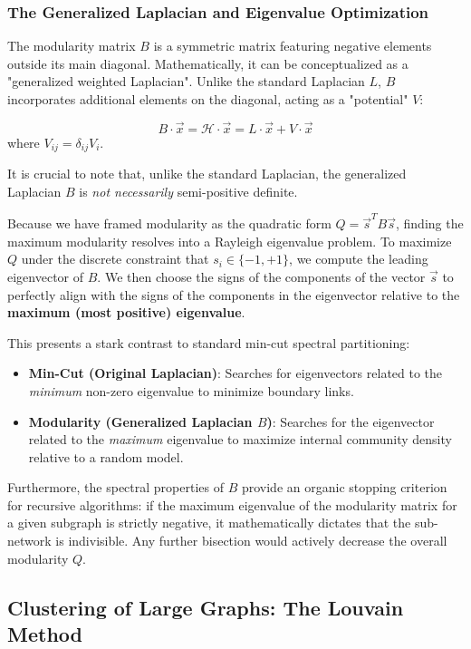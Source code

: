 \subsubsection{The Generalized Laplacian and Eigenvalue Optimization}

The modularity matrix $B$ is a symmetric matrix featuring negative elements outside its main diagonal. Mathematically, it can be conceptualized as a "generalized weighted Laplacian". Unlike the standard Laplacian $L$, $B$ incorporates additional elements on the diagonal, acting as a "potential" $V$:

$$B \cdot \vec{x} = \mathcal{H} \cdot \vec{x} = L \cdot \vec{x} + V \cdot \vec{x}$$
where $V_{ij} = \delta_{ij} V_i$.

It is crucial to note that, unlike the standard Laplacian, the generalized Laplacian $B$ is \textit{not necessarily} semi-positive definite.

Because we have framed modularity as the quadratic form $Q = \vec{s}^T B \vec{s}$, finding the maximum modularity resolves into a Rayleigh eigenvalue problem. To maximize $Q$ under the discrete constraint that $s_i \in \{-1, +1\}$, we compute the leading eigenvector of $B$. We then choose the signs of the components of the vector $\vec{s}$ to perfectly align with the signs of the components in the eigenvector relative to the \textbf{maximum (most positive) eigenvalue}.

This presents a stark contrast to standard min-cut spectral partitioning:
\begin{itemize}
    \item \textbf{Min-Cut (Original Laplacian)}: Searches for eigenvectors related to the \textit{minimum} non-zero eigenvalue to minimize boundary links.
    \item \textbf{Modularity (Generalized Laplacian $B$)}: Searches for the eigenvector related to the \textit{maximum} eigenvalue to maximize internal community density relative to a random model.
\end{itemize}

Furthermore, the spectral properties of $B$ provide an organic stopping criterion for recursive algorithms: if the maximum eigenvalue of the modularity matrix for a given subgraph is strictly negative, it mathematically dictates that the sub-network is indivisible. Any further bisection would actively decrease the overall modularity $Q$.

\subsection{Clustering of Large Graphs: The Louvain Method}
\label{subsec:louvain_method}

